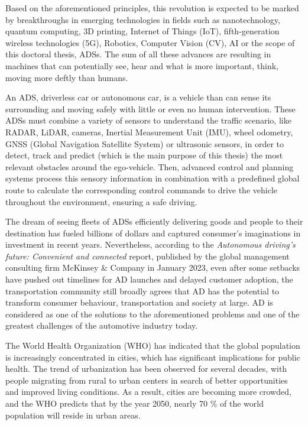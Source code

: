 Based on the aforementioned principles, this revolution is expected to be marked by breakthroughs in emerging technologies in fields such as nanotechnology, quantum computing, 3D printing, Internet of Things (IoT), fifth-generation wireless technologies (5G), Robotics, Computer Vision (CV), \ac{AI} or the scope of this doctoral thesis, \acp{ADS}. The sum of all these advances are resulting in machines that can potentially see, hear and what is more important, think, moving more deftly than humans. 

An \ac{ADS}, driverless car or autonomous car, is a vehicle than can sense its surrounding and moving safely with little or even no human intervention. These \acp{ADS} must combine a variety of sensors to understand the traffic scenario, like \ac{RADAR}, \ac{LiDAR}, cameras, Inertial Measurement Unit (IMU), wheel odometry, GNSS (Global Navigation Satellite System) or ultrasonic sensors, in order to detect, track and predict (which is the main purpose of this thesis) the most relevant obstacles around the ego-vehicle. Then, advanced control and planning systems process this sensory information in combination with a predefined global route to calculate the corresponding control commands to drive the vehicle throughout the environment, ensuring a safe driving. 

The dream of seeing fleets of \acp{ADS} efficiently delivering goods and people to their destination has fueled billions of dollars and captured consumer's imaginations in investment in recent years. Nevertheless, according to the \textit{Autonomous driving's future: Convenient and connected} report, published by the global management consulting firm McKinsey \& Company in January 2023, even after some setbacks have pushed out timelines for \ac{AD} launches and delayed customer adoption, the transportation community still broadly agrees that \ac{AD} has the potential to transform consumer behaviour, transportation and society at large. \ac{AD} is considered as one of the solutions to the aforementioned problems and one of the greatest challenges of the automotive industry today. 

The World Health Organization (WHO) has indicated that the global population is increasingly concentrated in cities, which has significant implications for public health. The trend of urbanization has been observed for several decades, with people migrating from rural to urban centers in search of better opportunities and improved living conditions. As a result, cities are becoming more crowded, and the WHO predicts that by the year 2050, nearly 70 \% of the world population will reside in urban areas.

